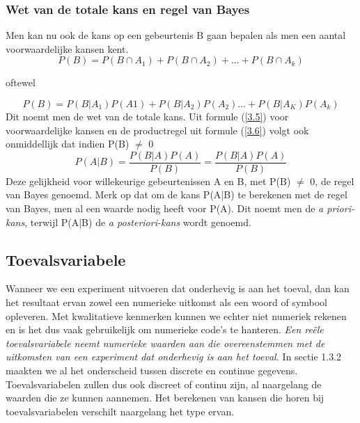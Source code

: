 \documentclass[titlepage]{article}
\numberwithin{equation}{section}
\begin{document}
 \subsubsection{Wet van de totale kans en regel van Bayes}
 Men kan nu ook de kans op een gebeurtenis B gaan bepalen als men een aantal voorwaardelijke kansen kent.
 \begin{equation}
 	P(B)=P(B\cap A_1)+P(B \cap A_2) + ... + P(B \cap A_k)
 \end{equation}
 \begin{center}
 	oftewel
 \end{center}
 \begin{equation}
 	P(B) = P(B|A_1)P(A1)+P(B|A_2)P(A_2) ... + P(B|A_K)P(A_k)
 \end{equation}
 Dit noemt men de wet van de totale kans. Uit formule (\ref{3.5}) voor voorwaardelijke kansen en de productregel uit formule (\ref{3.6}) volgt ook onmiddellijk dat indien P(B) $\neq$ 0
 \begin{equation}
 	P(A|B) = \frac{P(B|A)P(A)}{P(B)} = \frac{P(B|A)P(A)}{P(B)}
 \end{equation}
 Deze gelijkheid voor willekeurige gebeurtenissen A en B, met P(B) $\neq$ 0, de regel van Bayes genoemd.\newline\newline
 Merk op dat om de kans P(A|B) te berekenen met de regel van Bayes, men al een waarde nodig heeft voor P(A). Dit noemt men de \textit{a priori-kans}, terwijl P(A|B) de \textit{a posteriori-kans} wordt genoemd.
 \subsection{Toevalsvariabele}
 Wanneer we een experiment uitvoeren dat onderhevig is aan het toeval, dan kan het resultaat ervan zowel een numerieke uitkomst als een woord of symbool opleveren. Met kwalitatieve kenmerken kunnen we echter niet numeriek rekenen en is het dus vaak gebruikelijk om numerieke code's te hanteren.\newline\newline
 \emph{Een reële toevalsvariabele neemt numerieke waarden aan die overeenstemmen met de uitkomsten van een experiment dat onderhevig is aan het toeval.} \newline\newline
 In sectie 1.3.2 maakten we al het onderscheid tussen discrete en continue gegevens. Toevalsvariabelen zullen dus ook discreet of continu zijn, al naargelang de waarden die ze kunnen aannemen. Het berekenen van kansen die horen bij toevalsvariabelen verschilt naargelang het type ervan.
\end{document}
